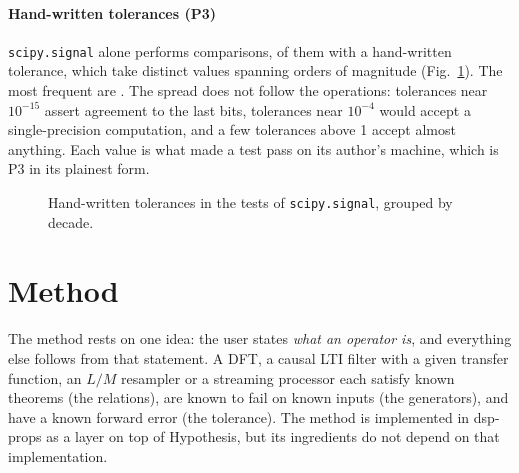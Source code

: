 \documentclass[10pt,conference]{IEEEtran}
\newcommand{\code}[1]{\texttt{#1}}
\begin{document}
\paragraph*{Hand-written tolerances (P3)} \code{scipy.signal} alone performs
\surveyScipyComparisons{} comparisons, \surveyScipyExplicit{} of them with a
hand-written tolerance, which take \surveyScipyDistinctTol{} distinct values
spanning \surveyScipyTolDecades{} orders of magnitude (Fig.~\ref{fig:tolhist}).
The most frequent are \surveyScipyTopTols. The spread does not follow the
operations: tolerances near $10^{-15}$ assert agreement to the last bits,
tolerances near $10^{-4}$ would accept a single-precision computation, and a few
tolerances above 1 accept almost anything. Each value is what made a test pass
on its author's machine, which is P3 in its plainest form.

\begin{figure}[t]
\centering
{}
\caption{Hand-written tolerances in the tests of \code{scipy.signal}, grouped by
decade.}
\label{fig:tolhist}
\end{figure}

\section{Method}
\label{sec:method}

The method rests on one idea: the user states \emph{what an operator is}, and
everything else follows from that statement. A DFT, a causal LTI filter with a
given transfer function, an $L/M$ resampler or a streaming processor each
satisfy known theorems (the relations), are known to fail on known inputs (the
generators), and have a known forward error (the tolerance). The method is
implemented in dsp-props as a layer on top of Hypothesis, but its ingredients
do not depend on that implementation.
\end{document}
